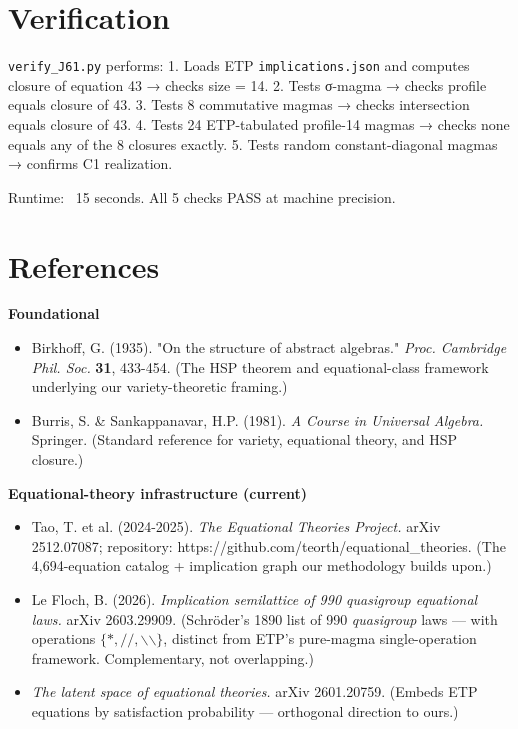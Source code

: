 \documentclass[11pt,reqno]{amsart}
\theoremstyle{plain}
\theoremstyle{definition}
\begin{document}
\section{Verification}

\texttt{verify_J61.py} performs:
1. Loads ETP \texttt{implications.json} and computes closure of equation 43 → checks size = 14.
2. Tests σ-magma → checks profile equals closure of 43.
3. Tests 8 commutative magmas → checks intersection equals closure of 43.
4. Tests 24 ETP-tabulated profile-14 magmas → checks none equals any of the 8 closures exactly.
5. Tests random constant-diagonal magmas → confirms C1 realization.

Runtime: ~15 seconds. All 5 checks PASS at machine precision.

\section{References}

\textbf{Foundational}
\begin{itemize}
\item Birkhoff, G. (1935). "On the structure of abstract algebras." \textit{Proc. Cambridge Phil. Soc.} \textbf{31}, 433-454. (The HSP theorem and equational-class framework underlying our variety-theoretic framing.)
\item Burris, S. \& Sankappanavar, H.P. (1981). \textit{A Course in Universal Algebra.} Springer. (Standard reference for variety, equational theory, and HSP closure.)
\end{itemize}

\textbf{Equational-theory infrastructure (current)}
\begin{itemize}
\item Tao, T. et al. (2024-2025). \textit{The Equational Theories Project.} arXiv 2512.07087; repository: https://github.com/teorth/equational_theories. (The 4,694-equation catalog + implication graph our methodology builds upon.)
\item Le Floch, B. (2026). \textit{Implication semilattice of 990 quasigroup equational laws.} arXiv 2603.29909. (Schröder's 1890 list of 990 \textit{quasigroup} laws --- with operations $\{*, //, \backslash\backslash\}$, distinct from ETP's pure-magma single-operation framework. Complementary, not overlapping.)
\item \textit{The latent space of equational theories.} arXiv 2601.20759. (Embeds ETP equations by satisfaction probability --- orthogonal direction to ours.)
\end{itemize}
\end{document}
